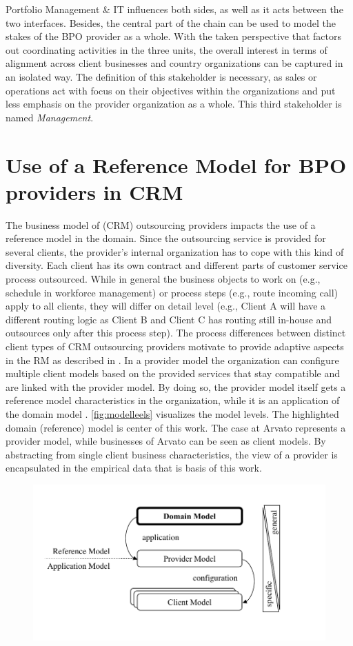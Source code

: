   Portfolio Management \& IT influences both sides, as well as it acts between the two interfaces. Besides, the central part of the chain can be used to model the stakes of the BPO provider as a whole. With the taken perspective that factors out coordinating activities in the three units, the overall interest in terms of alignment across client businesses and country organizations can be captured in an isolated way. The definition of this stakeholder is necessary, as sales or operations act with focus on their objectives within the organizations and put less emphasis on the provider organization as a whole. This third stakeholder is named \textit{Management}. 
  

\section{Use of a Reference Model for BPO providers in CRM}
\label{sec:refmodusearvato}
The business model of (CRM) outsourcing providers impacts the use of a reference model in the domain. Since the outsourcing service is provided for several clients, the provider’s internal organization has to cope with this kind of diversity. Each client has its own contract and different parts of customer service process outsourced. While in general the business objects to work on (e.g., schedule in workforce management) or process steps (e.g., route incoming call) apply to all clients, they will differ on detail level (e.g., Client A will have a different routing logic as Client B and Client C has routing still in-house and outsources only after this process step).
The process differences between distinct client types of CRM outsourcing providers motivate to provide adaptive aspects in the \acrshort{RM} as described in \citep{delfmann2006adaptive}. In a provider model the organization can configure multiple client models based on the provided services that stay compatible and are linked with the provider model. By doing so, the provider model itself gets a reference model characteristics in the organization, while it is an application of the domain model . \Fig \ref{fig:modelleels} visualizes the model levels. The highlighted domain (reference) model is center of this work. The case at Arvato represents a provider model, while businesses of Arvato can be seen as client models. By abstracting from single client business characteristics, the view of a provider is encapsulated in the empirical data that is basis of this work. 
\begin{figure}[caption={Model levels}, label={fig:modellevels}]
	{	\includegraphics[width=.8\textwidth]{figures/refmodlevels.pdf}}
\end{figure}

